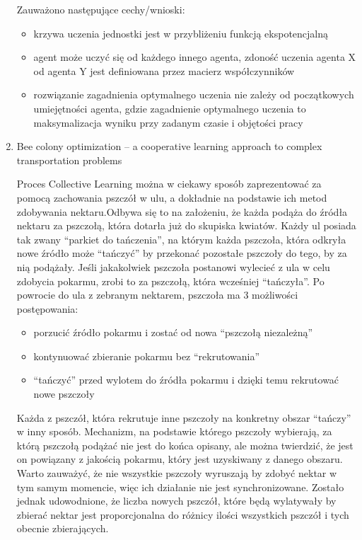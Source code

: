 \documentclass[11pt]{aghdpl}
\begin{document}
\begin{enumerate}
Zauważono następujące cechy/wnioski:

\begin{itemize}
        \item krzywa uczenia jednostki jest w przybliżeniu funkcją ekspotencjalną
        \item agent może uczyć się od każdego innego agenta, zdoność uczenia agenta X od agenta Y jest definiowana przez macierz współczynników
        \item rozwiązanie zagadnienia optymalnego uczenia nie zależy od początkowych umiejętności agenta, gdzie zagadnienie optymalnego uczenia to maksymalizacja wyniku przy zadanym czasie i objętości pracy
\end{itemize}

\item Bee colony optimization – a cooperative learning approach to complex transportation problems \cite{BeeColonyOptimization}

Proces Collective Learning można w ciekawy sposób zaprezentować za pomocą zachowania pszczół w ulu, a dokładnie na podstawie ich metod zdobywania nektaru.Odbywa się to na założeniu, że każda podąża do źródła nektaru  za pszczołą, która dotarła już do skupiska kwiatów.  Każdy ul posiada tak zwany “parkiet do tańczenia”, na którym każda pszczoła, która odkryła nowe źródło może “tańczyć” by przekonać pozostałe pszczoły do tego, by za nią podążały. Jeśli jakakolwiek pszczoła postanowi wylecieć z ula w celu zdobycia pokarmu, zrobi to za pszczołą, która wcześniej “tańczyła”. Po powrocie do ula z zebranym nektarem, pszczoła ma 3 możliwości postępowania:
\begin{itemize}
        \item porzucić źródło pokarmu i zostać od nowa “pszczołą niezależną”
        \item kontynuować zbieranie pokarmu bez “rekrutowania”
        \item “tańczyć” przed wylotem do źródła pokarmu i dzięki temu rekrutować nowe pszczoły
\end{itemize}

Każda z pszczół, która rekrutuje inne pszczoły na konkretny obszar “tańczy” w inny sposób.
Mechanizm, na podstawie którego pszczoły wybierają, za którą pszczołą podążać nie jest do końca opisany, ale można twierdzić, że jest on powiązany z jakością pokarmu, który jest uzyskiwany z danego obszaru. Warto zauważyć, że nie wszystkie pszczoły wyruszają by zdobyć nektar w tym samym momencie, więc ich działanie nie jest synchronizowane. Zostało jednak udowodnione, że liczba nowych pszczół, które będą wylatywały by zbierać nektar jest proporcjonalna do różnicy ilości wszystkich pszczół i tych obecnie zbierających.


\end{enumerate}
\end{document}
